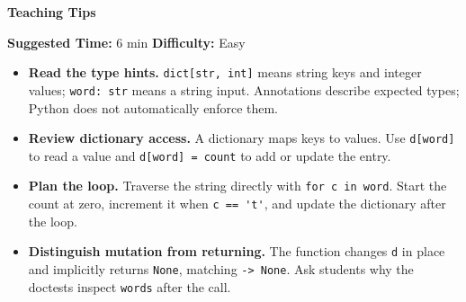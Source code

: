 \begin{questionmeta}
\begin{blocksection}
\textbf{Teaching Tips}

\textbf{Suggested Time:} 6 min \qquad \textbf{Difficulty:} Easy
\begin{itemize}
    \item \textbf{Read the type hints.}
    \lstinline{dict[str, int]} means string keys and integer values;
    \lstinline{word: str} means a string input. Annotations describe expected
    types; Python does not automatically enforce them.

    \item \textbf{Review dictionary access.}
    A dictionary maps keys to values. Use \lstinline{d[word]} to read a value
    and \lstinline{d[word] = count} to add or update the entry.

    \item \textbf{Plan the loop.}
    Traverse the string directly with \lstinline{for c in word}.
    Start the count at zero, increment it when \lstinline{c == 't'},
    and update the dictionary after the loop.

    \item \textbf{Distinguish mutation from returning.}
    The function changes \lstinline{d} in place and implicitly returns
    \lstinline{None}, matching \lstinline{-> None}.
    Ask students why the doctests inspect \lstinline{words} after the call.
\end{itemize}
\end{blocksection}
\end{questionmeta}
